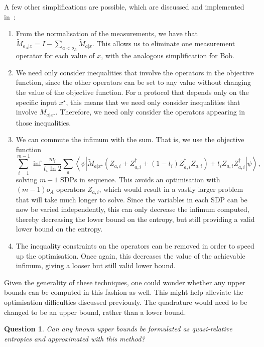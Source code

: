 \documentclass[10pt, a4paper]{article}
\numberwithin{equation}{section} %
\theoremstyle{definition}
\theoremstyle{plain}
\newtheorem{question}{Question}
\newcommand{\?}{\mathrel{?}} %
\newcommand{\angleb}[1]{\left\langle #1 \right\rangle} %
\begin{document}
      A few other simplifications are possible, which are discussed and implemented in~\cite{BFF_QRE}:
      \begin{enumerate}
        \item From the normalisation of the measurements, we have that \(\tilde{M}_{o_A|x} = I - \sum_{a < o_A} \tilde{M}_{a|x}\). This allows us to eliminate one measurement operator for each value of \(x\), with the analogous simplification for Bob.
        \item We need only consider inequalities that involve the operators in the objective function, since the other operators can be set to any value without changing the value of the objective function. For a protocol that depends only on the specific input \(x^{\star}\), this means that we need only consider inequalities that involve \(M_{a|x^{\star}}\). Therefore, we need only consider the operators appearing in those inequalities.
        \item We can commute the infimum with the sum. That is, we use the objective function
          \begin{equation} 
            \sum_{i=1}^{m-1} \inf \frac{w_i}{t_i \ln 2} \sum_a \angleb{\psi\left|
          \tilde{M}_{a|x^{\star}} \left( Z_{a,i} + Z_{a,i}^{\dagger} + (1-t_i)  Z_{a,i}^{\dagger}Z_{a,i}\right) + t_i Z_{a,i}Z_{a,i}^{\dagger} \right|\psi},
          \end{equation}
          solving \(m-1\) SDPs in sequence. This avoids an optimisation with \((m-1)o_A\) operators \(Z_{a,i}\), which would result in a vastly larger problem that will take much longer to solve. Since the variables in each SDP can be now be varied independently, this can only decrease the infimum computed, thereby decreasing the lower bound on the entropy, but still providing a valid lower bound on the entropy.
        \item The inequality constraints on the operators can be removed in order to speed up the optimisation. Once again, this decreases the value of the achievable infimum, giving a looser but still valid lower bound.
      \end{enumerate}

      Given the generality of these techniques, one could wonder whether any upper bounds can be computed in this fashion as well. This might help alleviate the optimisation difficulties discussed previously. The quadrature would need to be changed to be an upper bound, rather than a lower bound.
      \begin{question}
        Can any known upper bounds be formulated as quasi-relative entropies and approximated with this method?
      \end{question}
\end{document}
